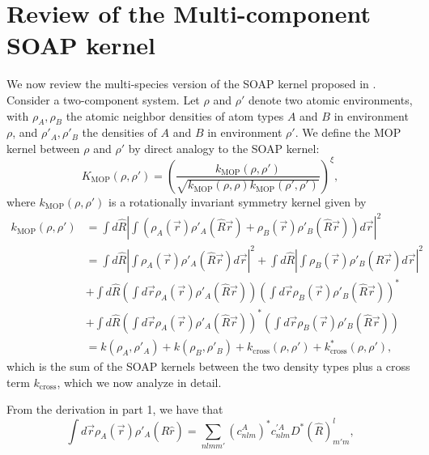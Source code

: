 \documentclass[%
preprint,
amsmath,amssymb,
aps,
]{revtex4-1}
\begin{document}
\section{Review of the Multi-component SOAP kernel}
We now review the multi-species version of the SOAP kernel proposed in \cite{de2016comparing}. Consider a two-component system. Let $\rho$ and $\rho'$ denote two atomic environments, with $\rho_A, \rho_B$ the atomic neighbor densities of atom types $A$ and $B$ in environment $\rho$, and $\rho'_A, \rho'_B$ the densities of $A$ and $B$ in environment $\rho'$. We define the MOP kernel between $\rho$ and $\rho'$ by direct analogy to the SOAP kernel:
\begin{equation}
    K_{\text{MOP}}(\rho, \rho') = \left(\frac{k_{\text{MOP}} (\rho, \rho')}{\sqrt{k_{\text{MOP}}(\rho, \rho) k_{\text{MOP}}(\rho', \rho')}} \right) ^{\xi},
\end{equation}
where $k_{\text{MOP}}(\rho, \rho')$ is a rotationally invariant symmetry kernel given by
\begin{equation}
    \begin{split}
    k_{\text{MOP}}(\rho, \rho') &= \int d\hat{R} \left| \int \left( \rho_A(\vec{r}) \rho'_A(\hat{R}\vec{r}) + \rho_B(\vec{r}) \rho'_B(\hat{R}\vec{r}) \right) d\vec{r} \right| ^2 \\
    &= \int d\hat{R} \left| \int \rho_A(\vec{r}) \rho'_A(\hat{R}\vec{r}) d\vec{r} \right|^2 + \int d\hat{R} \left| \int \rho_B(\vec{r}) \rho'_B(\hat{R}\vec{r}) d\vec{r} \right|^2 \\
    &+ \int d \hat{R} \left( \int d\vec{r} \rho_A(\vec{r}) \rho'_A(\hat{R} \vec{r}) \right) \left( \int d\vec{r} \rho_B(\vec{r}) \rho'_B(\hat{R} \vec{r}) \right)^* \\
    &+ \int d \hat{R} \left( \int d\vec{r} \rho_A(\vec{r}) \rho'_A(\hat{R} \vec{r}) \right)^* \left( \int d\vec{r} \rho_B(\vec{r}) \rho'_B(\hat{R} \vec{r}) \right) \\
    &= k(\rho_A, \rho'_A) + k(\rho_B, \rho'_B) + k_{\text{cross}}(\rho, \rho') + k_{\text{cross}}^*(\rho, \rho'),
    \end{split}
\end{equation}
which is the sum of the SOAP kernels between the two density types plus a cross term $k_{\text{cross}}$, which we now analyze in detail.

From the derivation in part 1, we have that
\begin{equation}
\int d\vec{r} \rho_A(\vec{r}) \rho'_A(\hat{R}\hat{r}) = \sum_{n l m m'} (c_{n l m}^A)^* c_{n l m}^{'A} D^* (\hat{R})^l_{m' m},
\end{equation}
\end{document}
